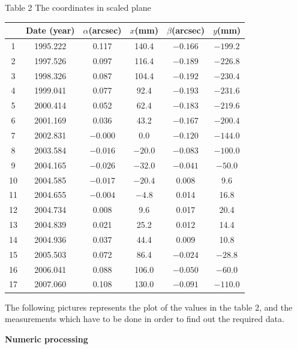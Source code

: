 \begin{center}
Table 2 The coordinates in scaled plane

\begin{tabular}{|c|c|c|c|c|c|}
\hline
 & Date (year) & $\alpha$(arcsec) & $x$(mm) & $\beta$(arcsec) & $y$(mm)\\
\hline
1  & 1995.222 & 0.117  & 140.4  & $-0.166$ & $-199.2$\\
2  & 1997.526 & 0.097  & 116.4  & $-0.189$ & $-226.8$\\
3  & 1998.326 & 0.087  & 104.4  & $-0.192$ & $-230.4$\\
4  & 1999.041 & 0.077  & 92.4   & $-0.193$ & $-231.6$\\
5  & 2000.414 & 0.052  & 62.4   & $-0.183$ & $-219.6$\\
6  & 2001.169 & 0.036  & 43.2   & $-0.167$ & $-200.4$\\
7  & 2002.831 & $-0.000$ & 0.0    & $-0.120$ & $-144.0$\\
8  & 2003.584 & $-0.016$ & $-20.0$  & $-0.083$ & $-100.0$\\
9  & 2004.165 & $-0.026$ & $-32.0$  & $-0.041$ & $-50.0$\\
10 & 2004.585 & $-0.017$ & $-20.4$  & 0.008  & 9.6\\
11 & 2004.655 & $-0.004$ & $-4.8$   & 0.014  & 16.8\\
12 & 2004.734 & 0.008  & 9.6    & 0.017  & 20.4\\
13 & 2004.839 & 0.021  & 25.2   & 0.012  & 14.4\\
14 & 2004.936 & 0.037  & 44.4   & 0.009  & 10.8\\
15 & 2005.503 & 0.072  & 86.4   & $-0.024$ & $-28.8$\\
16 & 2006.041 & 0.088  & 106.0  & $-0.050$ & $-60.0$\\
17 & 2007.060 & 0.108  & 130.0  & $-0.091$ & $-110.0$\\
\hline
\end{tabular}
\end{center}

The following pictures represents the plot of the values in the table 2, and
the measurements which have to be done in order to find out the required data.

\textbf{Numeric processing}

